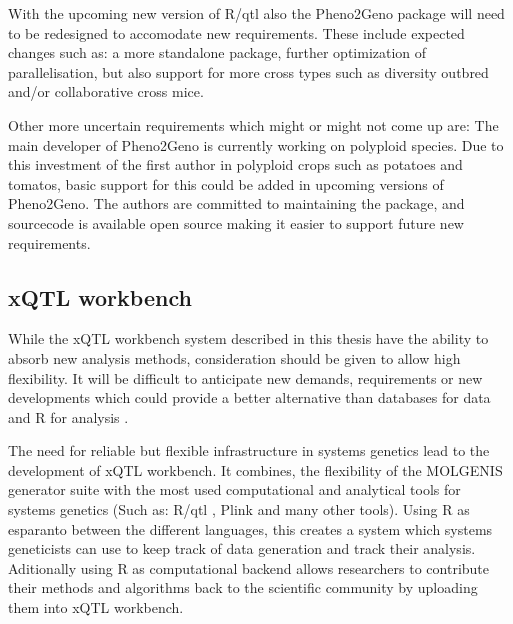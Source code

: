 With the upcoming new version of R/qtl also the Pheno2Geno package will need to be redesigned 
to accomodate new requirements. These include expected changes such as: a more standalone package, 
further optimization of parallelisation, but also support for more cross types such as 
diversity outbred and/or collaborative cross mice. 

Other more uncertain requirements which might or might not come up are: The main developer 
of Pheno2Geno is currently working on polyploid species. Due to this investment of the first 
author in polyploid crops such as potatoes and tomatos, basic support for this could be added 
in upcoming versions of Pheno2Geno. The authors are committed to maintaining the package, 
and sourcecode is available open source making it easier to support future new requirements.

\subsection{xQTL workbench}
While the xQTL workbench system described in this thesis have the ability to absorb new 
analysis methods, consideration should be given to allow high flexibility. It will be 
difficult to anticipate new demands, requirements or new developments which could provide 
a better alternative than databases for data and R for analysis \cite{Arends:2012}.

The need for reliable but flexible infrastructure in systems genetics lead to the development of 
xQTL workbench. It combines, the flexibility of the MOLGENIS generator suite \cite{Swertz:2010b} 
with the most used computational and analytical tools for systems genetics (Such as: R/qtl 
\cite{Broman:2003, Arends:2010}, Plink \cite{Purcell:2007} and many other tools). Using R as 
esparanto between the different languages, this creates a system which systems geneticists can 
use to keep track of data generation and track their analysis. Aditionally using R as computational 
backend allows researchers to contribute their methods and algorithms back to the scientific 
community by uploading them into xQTL workbench.

